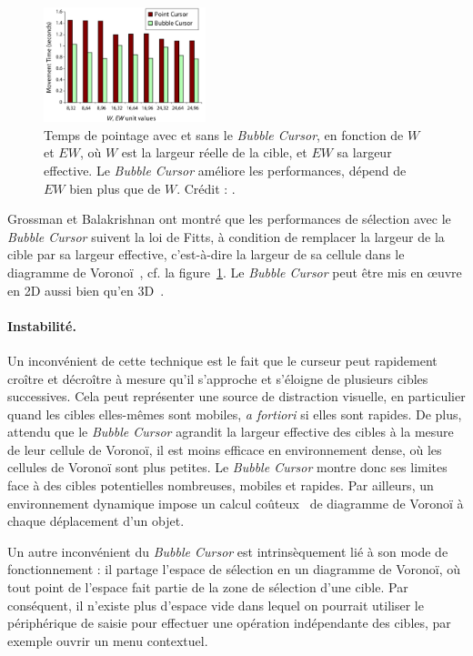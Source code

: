	\begin{figure}
		\centering
		\includegraphics[width=0.42\textwidth]{figures/ch2/bubbleResults}
		\caption[\emph{Bubble Cursor} --  performances]{Temps de pointage avec et sans le \emph{Bubble Cursor}, en fonction de $W$ et $EW$, où $W$ est la largeur réelle de la cible, et $EW$ sa largeur effective. Le \emph{Bubble Cursor} améliore les performances, dépend de $EW$ bien plus que de $W$. Crédit : \cite{grossman2005bubble}.}
		\label{fig:bubbleResults}
	\end{figure}
	
	Grossman et Balakrishnan ont montré que les performances de sélection avec le \emph{Bubble Cursor} suivent la loi de Fitts, à condition de remplacer la largeur de la cible par sa largeur effective, c'est-à-dire la largeur de sa cellule dans le diagramme de Voronoï~\cite{grossman2005bubble}, cf. la figure~\ref{fig:bubbleResults}. Le \emph{Bubble Cursor} peut être mis en œuvre en 2D aussi bien qu'en 3D~\cite{vanacken2007exploring}.

	\paragraph{Instabilité.}
	Un inconvénient de cette technique est le fait que le curseur peut rapidement croître et décroître à mesure qu'il s'approche et s'éloigne de plusieurs cibles successives. Cela peut représenter une source de distraction visuelle, en particulier quand les cibles elles-mêmes sont mobiles, \emph{a fortiori} si elles sont rapides. De plus, attendu que le \emph{Bubble Cursor} agrandit la largeur effective des cibles à la mesure de leur cellule de Voronoï, il est moins efficace en environnement dense, où les cellules de Voronoï sont plus petites. Le \emph{Bubble Cursor} montre donc ses limites face à des cibles potentielles nombreuses, mobiles et rapides. Par ailleurs, un environnement dynamique impose un calcul coûteux~\cite{aurenhammer2000voronoi} de diagramme de Voronoï à chaque déplacement d'un objet.
	
	Un autre inconvénient du \emph{Bubble Cursor} est intrinsèquement lié à son mode de fonctionnement : il partage l'espace de sélection en un diagramme de Voronoï, où tout point de l'espace fait partie de la zone de sélection d'une cible. Par conséquent, il n'existe plus d'espace \og vide \fg{} dans lequel on pourrait utiliser le périphérique de saisie pour effectuer une opération indépendante des cibles, par exemple ouvrir un menu contextuel.

